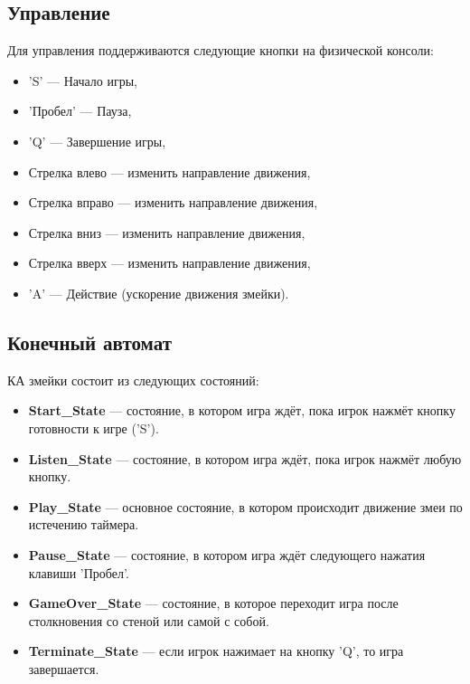 \documentclass{article}
\begin{document}
\subsection{Управление}
Для управления поддерживаются следующие кнопки на физической консоли:
\begin{itemize}
    \item 'S' — Начало игры,
    \item 'Пробел' — Пауза,
    \item 'Q' — Завершение игры,
    \item Стрелка влево — изменить направление движения,
    \item Стрелка вправо — изменить направление движения,
    \item Стрелка вниз — изменить направление движения,
    \item Стрелка вверх — изменить направление движения,
    \item 'A' — Действие (ускорение движения змейки).
\end{itemize}

\subsection{Конечный автомат}
КА змейки состоит из следующих состояний:
\begin{itemize}
    \item \textbf{Start\_State} — состояние, в котором игра ждёт, пока игрок нажмёт кнопку готовности к игре ('S').
    \item \textbf{Listen\_State} — состояние, в котором игра ждёт, пока игрок нажмёт любую кнопку.
    \item \textbf{Play\_State} — основное состояние, в котором происходит движение змеи по истечению таймера.
    \item \textbf{Pause\_State} — состояние, в котором игра ждёт следующего нажатия клавиши 'Пробел'.
    \item \textbf{GameOver\_State} — состояние, в которое переходит игра после столкновения со стеной или самой с собой.
    \item \textbf{Terminate\_State} — если игрок нажимает на кнопку 'Q', то игра завершается.
\end{itemize}
\end{document}
